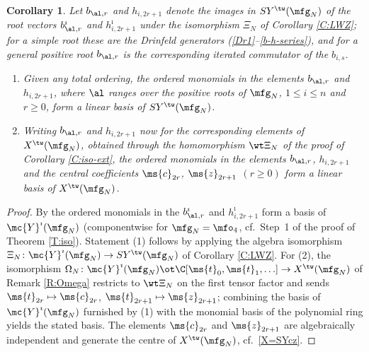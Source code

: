\documentclass{amsart}
\newtheorem{crl}[theorem]{Corollary}
\numberwithin{equation}{section}
\theoremstyle{remark}
\renewcommand{\,}{\kern 0.1em} %
\begin{document}
\begin{crl} \label{C:PBW}
%
Let $b_{\al,r}$ and $h_{i,2r+1}$ denote the images in $SY^{\tw}(\mfg_N)$ of the root vectors $b^{\imath}_{\al,r}$ and $h^{\imath}_{i,2r+1}$ under the isomorphism $\Xi_N$ of Corollary \ref{C:LWZ}; for a simple root these are the Drinfeld generators \textup{(\ref{Dr1}--\ref{b-h-series})}, and for a general positive root $b_{\al,r}$ is the corresponding iterated commutator of the $b_{i,s}$.
\begin{enumerate}
\item Given any total ordering, the ordered monomials in the elements $b_{\al,r}$ and $h_{i,2r+1}$, where $\al$ ranges over the positive roots of $\mfg_N$, $1\le i\le n$ and $r\ge0$, form a linear basis of $SY^{\tw}(\mfg_N)$.
\item Writing $b_{\al,r}$ and $h_{i,2r+1}$ now for the corresponding elements of $X^{\tw}(\mfg_N)$, obtained through the homomorphism $\wt\Xi_N$ of the proof of Corollary \ref{C:iso-ext}, the ordered monomials in the elements $b_{\al,r}$, $h_{i,2r+1}$ and the central coefficients $\ms{c}_{2r}$, $\ms{z}_{2r+1}$ $(r\ge0)$ form a linear basis of $X^{\tw}(\mfg_N)$.
\end{enumerate}
%
\end{crl}

\begin{proof}
%
By \cite[Thm.~4.12]{LWZ25b} the ordered monomials in the $b^{\imath}_{\al,r}$ and $h^{\imath}_{i,2r+1}$ form a basis of $\mc{Y}^{\imath}(\mfg_N)$ (componentwise for $\mfg_N = \mfo_4$, cf.~Step~1 of the proof of Theorem \ref{T:iso}). Statement (1) follows by applying the algebra isomorphism $\Xi_N \colon \mc{Y}^{\imath}(\mfg_N) \to SY^{\tw}(\mfg_N)$ of Corollary \ref{C:LWZ}. For (2), the isomorphism $\Omega_N \colon \mc{Y}^{\imath}(\mfg_N) \ot \C[\ms{t}_0, \ms{t}_1, \ldots] \to X^{\tw}(\mfg_N)$ of Remark \ref{R:Omega} restricts to $\wt\Xi_N$ on the first tensor factor and sends $\ms{t}_{2r} \mapsto \ms{c}_{2r}$, $\ms{t}_{2r+1} \mapsto \ms{z}_{2r+1}$; combining the basis of $\mc{Y}^{\imath}(\mfg_N)$ furnished by (1) with the monomial basis of the polynomial ring yields the stated basis. The elements $\ms{c}_{2r}$ and $\ms{z}_{2r+1}$ are algebraically independent and generate the centre of $X^{\tw}(\mfg_N)$, cf.~\eqref{X=SYcz}.
%
\end{proof}

\end{document}
